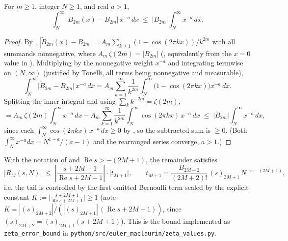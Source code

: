 \begin{lemma}
\label{lem:centered_kernel_avg}
\leanok
{}
For $m \ge 1$, integer $N \ge 1$, and real $a > 1$,
\[
  \int_N^{\infty}\bigl|\widetilde{B}_{2m}(x) - B_{2m}\bigr|\,x^{-a}\,dx
    \;\le\; |B_{2m}| \int_N^{\infty} x^{-a}\,dx .
\]
\end{lemma}

\begin{proof}
\leanok
{}
By , $|\widetilde{B}_{2m}(x) - B_{2m}|
= A_m \sum_{k\ge1}(1-\cos(2\pi k x))/k^{2m}$ with all summands nonnegative, where
$A_m\,\zeta(2m) = |B_{2m}|$ (, equivalently from the $x=0$
value in ). Multiplying by the nonnegative weight
$x^{-a}$ and integrating termwise on $(N,\infty)$ (justified by Tonelli, all terms being
nonnegative and measurable),
\[
  \int_N^{\infty}\bigl|\widetilde{B}_{2m} - B_{2m}\bigr|\,x^{-a}\,dx
  = A_m \sum_{k=1}^{\infty}\frac{1}{k^{2m}}\int_N^{\infty}\bigl(1 - \cos(2\pi k x)\bigr)x^{-a}\,dx .
\]
Splitting the inner integral and using $\sum_k k^{-2m} = \zeta(2m)$,
\[
  = A_m\,\zeta(2m)\int_N^{\infty} x^{-a}\,dx
    - A_m \sum_{k=1}^{\infty}\frac{1}{k^{2m}}\int_N^{\infty}\cos(2\pi k x)\,x^{-a}\,dx
  \;\le\; |B_{2m}|\int_N^{\infty} x^{-a}\,dx,
\]
since each $\int_N^{\infty}\cos(2\pi k x)\,x^{-a}\,dx \ge 0$ by , so the
subtracted sum is $\ge 0$. (Both $\int_N^{\infty} x^{-a}dx = N^{1-a}/(a-1)$ and the rearranged
series converge, $a > 1$.)
\end{proof}

\begin{theorem}
\label{thm:zeta_error_bound}
\leanok
{}
With the notation of  and $\operatorname{Re} s > -(2M+1)$, the
remainder satisfies
\[
  \bigl| R_M(s, N) \bigr| \;\le\;
    \left| \frac{s + 2M+1}{\operatorname{Re} s + 2M + 1} \right| \cdot \bigl| t_{M+1} \bigr|,
  \qquad
  t_{M+1} = \frac{B_{2M+2}}{(2M+2)!}\,(s)_{2M+1}\,N^{-s-(2M+1)},
\]
i.e. the tail is controlled by the first omitted Bernoulli term scaled by the explicit
constant $K := \bigl|\tfrac{s+2M+1}{\operatorname{Re} s+2M+1}\bigr| \ge 1$ (note
$K = |(s)_{2M+2}| / (|(s)_{2M+1}|\,(\operatorname{Re} s+2M+1))$, since
$(s)_{2M+2} = (s)_{2M+1}(s+2M+1)$). This is the bound implemented as \texttt{zeta\_error\_bound} in
\texttt{python/src/euler\_maclaurin/zeta\_values.py}.
\end{theorem}

